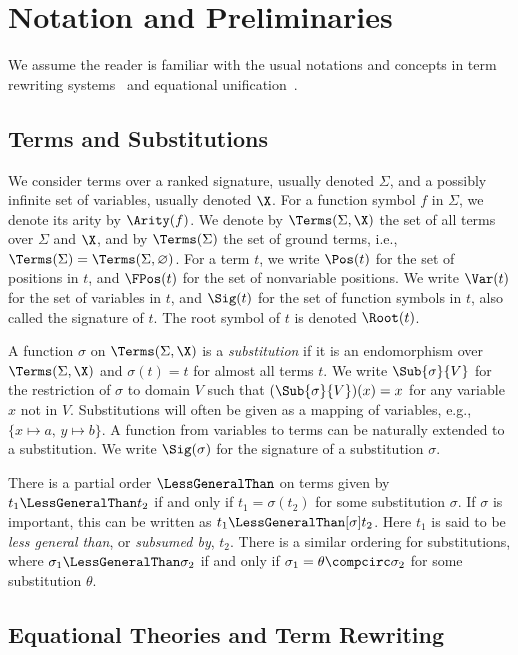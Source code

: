 \chapter{Notation and Preliminaries}\label{chap:prelims}

We assume the reader is familiar with the usual notations and concepts in term
rewriting systems~\cite{Term} and equational unification~\cite{BaaderSnyd-01}.

\section{Terms and Substitutions}\label{sec:terms-subs}

We consider terms over a ranked signature, usually denoted $\Sigma$, and a
possibly infinite set of variables, usually denoted $\X$. For a function symbol
$f$ in $\Sigma$, we denote its arity by $\Arity(f)$. We denote by
$\Terms(\Sigma, \X)$ the set of all terms over $\Sigma$ and $\X$, and by
$\Terms(\Sigma)$ the set of ground terms, i.e., $\Terms(\Sigma) =
\Terms(\Sigma, \varnothing)$. For a term $t$, we write $\Pos(t)$ for the set of
positions in $t$, and $\FPos(t)$ for the set of nonvariable positions. We write
$\Var(t)$ for the set of variables in $t$, and $\Sig(t)$ for the set of
function symbols in $t$, also called the signature of $t$. The root symbol of
$t$ is denoted $\Root(t)$.

A function $\sigma$ on $\Terms(\Sigma, \X)$ is a \emph{substitution} if it is
an endomorphism over $\Terms(\Sigma, \X)$ and $\sigma(t) = t$ for almost all
terms $t$. We write $\Sub{\sigma}{V}$ for the restriction of $\sigma$ to domain
$V$ such that $(\Sub{\sigma}{V})(x) = x$ for any variable $x$ not in $V$.
Substitutions will often be given as a mapping of variables, e.g., $\{ x
\mapsto a,\, y \mapsto b \}$. A function from variables to terms can be
naturally extended to a substitution. We write $\Sig(\sigma)$ for the signature
of a substitution $\sigma$.

There is a partial order $\LessGeneralThan$ on terms given by $t_1
\LessGeneralThan t_2$ if and only if $t_1 = \sigma(t_2)$ for some substitution
$\sigma$. If $\sigma$ is important, this can be written as $t_1
\LessGeneralThan[\sigma] t_2$. Here $t_1$ is said to be \emph{less general
than}, or \emph{subsumed by}, $t_2$. There is a similar ordering for
substitutions, where $\sigma_1 \LessGeneralThan \sigma_2$ if and only if
$\sigma_1 = \theta \compcirc \sigma_2$ for some substitution $\theta$.

\section{Equational Theories and Term Rewriting}\label{sec:eq-sys-term-rew}

